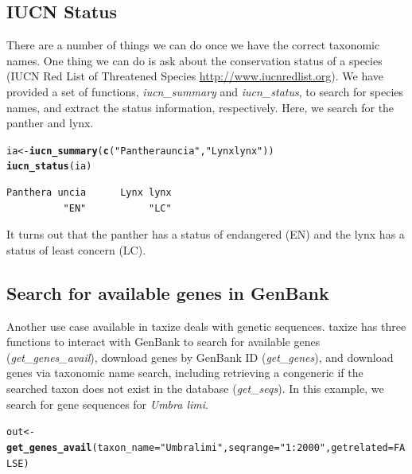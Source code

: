 \documentclass[10pt,a4paper,twocolumn]{article}
\makeatletter
\newcommand{\hlfunctioncall}[1]{\textcolor[rgb]{0.501960784313725,0,0.329411764705882}{\textbf{#1}}}%
\newcommand{\hlstring}[1]{\textcolor[rgb]{0.6,0.6,1}{#1}}%
\newenvironment{kframe}{%
 \def\at@end@of@kframe{}%
 \ifinner\ifhmode%
  \def\at@end@of@kframe{\end{minipage}}%
  \begin{minipage}{\columnwidth}%
 \fi\fi%
 \def\FrameCommand##1{\hskip\@totalleftmargin \hskip-\fboxsep
 \colorbox{shadecolor}{##1}\hskip-\fboxsep
     \hskip-\linewidth \hskip-\@totalleftmargin \hskip\columnwidth}%
 \MakeFramed {\advance\hsize-\width
   \@totalleftmargin\z@ \linewidth\hsize
   \@setminipage}}%
 {\par\unskip\endMakeFramed%
 \at@end@of@kframe}
\newenvironment{knitrout}{}{} %
\makeatother
\begin{document}
\subsection*{IUCN Status}
There are a number of things we can do once we have the correct taxonomic names. One thing we can do is ask about the conservation status of a species (IUCN Red List of Threatened Species \url{http://www.iucnredlist.org}). We have provided a set of functions, \emph{iucn\_summary} and \emph{iucn\_status}, to search for species names, and extract the status information, respectively. Here, we search for the panther and lynx.  

\begin{knitrout}
\begin{scriptsize}
\color{fgcolor}\begin{kframe}
\begin{alltt}
ia <- \hlfunctioncall{iucn_summary}(\hlfunctioncall{c}(\hlstring{"Panthera uncia"}, \hlstring{"Lynx lynx"}))
\hlfunctioncall{iucn_status}(ia)
\end{alltt}
\begin{verbatim}
Panthera uncia      Lynx lynx 
          "EN"           "LC" 
\end{verbatim}
\end{kframe}
\end{scriptsize}
\end{knitrout}


It turns out that the panther has a status of endangered (EN) and the lynx has a status of least concern (LC).

\subsection*{Search for available genes in GenBank}
Another use case available in taxize deals with genetic sequences. taxize has three functions to interact with GenBank to search for available genes (\emph{get\_genes\_avail}), download genes by GenBank ID (\emph{get\_genes}), and download genes via taxonomic name search, including retrieving a congeneric if the searched taxon does not exist in the database (\emph{get\_seqs}). In this example, we search for gene sequences for \emph{Umbra limi}.

\begin{knitrout}
\begin{scriptsize}
\color{fgcolor}\begin{kframe}
\begin{alltt}
out <- \hlfunctioncall{get_genes_avail}(taxon_name = \hlstring{"Umbra limi"}, \newline seqrange = \hlstring{"1:2000"}, getrelated = FALSE)
\end{alltt}
\end{kframe}
\end{scriptsize}
\end{knitrout}
\end{document}
